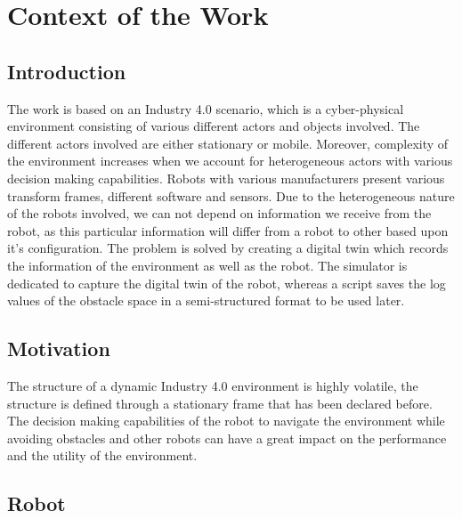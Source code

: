 \chapter{Context of the Work}

\label{Chapter1}

\section{Introduction}
The work is based on an Industry 4.0 scenario, which is a cyber-physical environment consisting of various different 
actors and objects involved. The different actors involved are either stationary or mobile. Moreover, complexity of the 
environment increases when we account for heterogeneous actors with various decision making capabilities. Robots with various
manufacturers present various transform frames, different software and sensors. Due to the heterogeneous nature of the robots 
involved, we can not depend on information we receive from the robot, as this particular information will differ from a robot 
to other based upon it's configuration. The problem is solved by creating a digital twin which records the information of the 
environment as well as the robot. The simulator is dedicated to capture the digital twin of the robot, whereas a script
saves the log values of the obstacle space in a semi-structured format to be used later.
\section{Motivation}
The structure of a dynamic Industry 4.0 environment is highly volatile, the structure is defined through a stationary frame that 
has been declared before. The decision making capabilities of the robot to navigate the environment while avoiding obstacles and 
other robots can have a great impact on the performance and the utility of the environment. 
\section{Robot}
